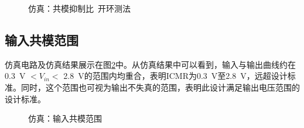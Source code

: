 \documentclass[UTF8]{ctexart}
\numberwithin{figure}{subsection}
\numberwithin{table}{subsection}
\numberwithin{equation}{subsection}
\begin{document}
\begin{figure}[H]
    \centering
    \caption{仿真：共模抑制比\ 开环测法}
    \label{CMRR open simulation}
\end{figure}

\subsection{输入共模范围}
仿真电路及仿真结果展示在图\ref{ICMR simulation}中。从仿真结果中可以看到，输入与输出曲线约在\SI[]{0.3}{\volt} \(< V_{in} <\) \SI[]{2.8}{\volt}的范围内均重合，表明ICMR为\SI[]{0.3}{\volt}至\SI[]{2.8}{\volt}，远超设计标准。同时，这个范围也可视为输出不失真的范围，表明此设计满足输出电压范围的设计标准。

\begin{figure}[H]
    \centering
    \caption{仿真：输入共模范围}
    \label{ICMR simulation}
\end{figure}
\end{document}
